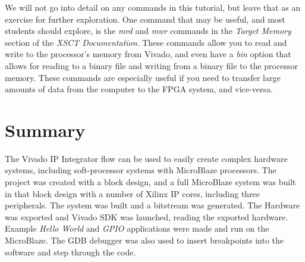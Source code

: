 \documentclass[11pt]{article}
\begin{document}
We will not go into detail on any commands in this tutorial, but leave that as an exercise for further exploration. One command that may be useful, and most students should explore, is the \textit{mrd} and \textit{mwr} commands in the \textit{Target Memory} section of the \textit{XSCT Documentation}. These commands allow you to read and write to the processor's memory from Vivado, and even have a \textit{bin} option that allows for reading to a binary file and writing from a binary file to the processor memory. These commands are especially useful if you need to transfer large amounts of data from the computer to the FPGA system, and vice-versa.




\section{Summary}
\label{sec:summary}
The Vivado IP Integrator flow can be used to easily create complex hardware systems, including soft-processor systems with MicroBlaze processors. The project was created with a block design, and a full MicroBlaze system was built in that block design with a number of Xilinx IP cores, including three peripherals. The system was built and a bitstream was generated. The Hardware was exported and Vivado SDK was launched, reading the exported hardware. Example \textit{Hello World} and \textit{GPIO} applications were made and run on the MicroBlaze. The GDB debugger was also used to insert breakpoints into the software and step through the code.



\end{document}
